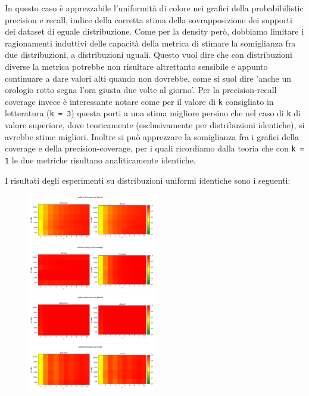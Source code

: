 In questo caso è apprezzabile l'uniformità di colore nei grafici della probabibilistic precision e recall, indice della corretta stima della sovrapposizione dei supporti dei dataset di eguale distribuzione.
Come per la density però, dobbiamo limitare i ragionamenti induttivi delle capacità della metrica di stimare la somiglianza fra due distribuzioni, a distribuzioni uguali. Questo vuol dire che con distribuzioni diverse la metrica potrebbe non risultare altrettanto sensibile e appunto continuare a dare valori alti quando non dovrebbe,
come si suol dire 'anche un orologio rotto segna l'ora giusta due volte al giorno'. Per la precision-recall coverage invece è interessante notare come per il valore di \texttt{k} consigliato in letteratura (\texttt{k = 3}) questa porti a una stima migliore persino che nel caso di \texttt{k} di valore superiore, dove teoricamente (esclusivamente per distribuzioni identiche), si avrebbe stime migliori. 
Inoltre si può apprezzare la somiglianza fra i grafici della coverage e della precision-coverage, per i quali ricordiamo dalla teoria che con \texttt{k = 1} le due metriche risultano analiticamente identiche.

I risultati degli esperimenti su distribuzioni uniformi identiche sono i seguenti:

\begin{figure}[h!]
    \includegraphics[width=0.5\textwidth]{../images/toyexperiments/kdim/uniform_iPrecision_iRecall.png} 
    \includegraphics[width=0.5\textwidth]{../images/toyexperiments/kdim/uniform_density_coverage.png} 
    \includegraphics[width=0.5\textwidth]{../images/toyexperiments/kdim/uniform_pPrecision_pRecall.png}
    \includegraphics[width=0.5\textwidth]{../images/toyexperiments/kdim/uniform_precision_recall.png} 
\end{figure}

